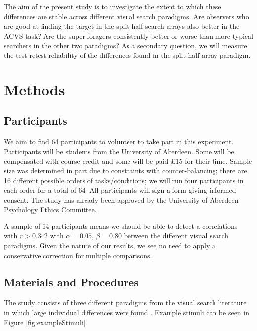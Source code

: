 \documentclass[]{rsos}%
\begin{document}
The aim of the present study is to investigate the extent to which these differences are stable across different visual search paradigms. Are observers who are good at finding the target in the split-half search arrays also better in the ACVS task? Are the super-foragers consistently better or worse than more typical searchers in the other two paradigms? As a secondary question, we will measure the test-retest reliability of the differences found in the split-half array paradigm. 


\section{Methods}


\subsection{Participants}
We aim to find 64 participants to volunteer to take part in this experiment. Participants will be students from the University of Aberdeen. Some will be compensated with course credit and some will be paid \pounds 15 for their time. Sample size was determined in part due to constraints with counter-balancing; there are 16 different possible orders of tasks/conditions; we will run four participants in each order for a total of 64. All participants will sign a form giving informed consent. The study has already been approved by the University of Aberdeen Psychology Ethics Committee.

A sample of 64 participants means we should be able to detect a correlations with $r > 0.342$ with $\alpha = 0.05$, $\beta = 0.80$ between the different visual search paradigms. Given the nature of our results, we see no need to apply a conservative correction for multiple comparisons. 

\subsection{Materials and Procedures}

The study consists of three different paradigms from the visual search literature in which large individual differences were found \cite{nowakowsak2017, irons-leber2016, kristjansson2014}. Example stimuli can be seen in Figure \ref{fig:exampleStimuli}.
\end{document}
